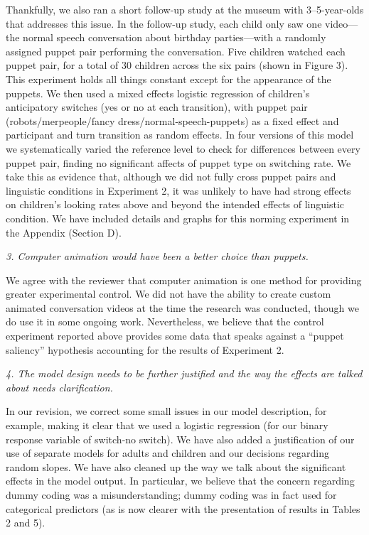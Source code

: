 \documentclass[11pt,a4paper]{letter} %
\begin{document}
\begin{letter}{}
Thankfully, we also ran a short follow-up study at the museum with 3--5-year-olds that addresses this issue. In the follow-up study, each child only saw one video---the normal speech conversation about birthday parties---with a randomly assigned puppet pair performing the conversation. Five children watched each puppet pair, for a total of 30 children across the six pairs (shown in Figure 3). This experiment holds all things constant except for the appearance of the puppets. We then used a mixed effects logistic regression of children's anticipatory switches (yes or no at each transition), with puppet pair (robots/merpeople/fancy dress/normal-speech-puppets) as a fixed effect and participant and turn transition as random effects. In four versions of this model we systematically varied the reference level to check for differences between every puppet pair, finding no significant affects of puppet type on switching rate. We take this as evidence that, although we did not fully cross puppet pairs and linguistic conditions in Experiment 2, it was unlikely to have had strong effects on children's looking rates above and beyond the intended effects of linguistic condition. We have included details and graphs for this norming experiment in the Appendix (Section D). 

\smallskip

\noindent \textit{3. Computer animation would have been a better choice than puppets.}

\noindent We agree with the reviewer that computer animation is one method for providing greater experimental control. We did not have the ability to create custom animated conversation videos at the time the research was conducted, though we do use it in some ongoing work. Nevertheless, we believe that the control experiment reported above provides some data that speaks against a ``puppet saliency'' hypothesis accounting for the results of Experiment 2. 

\smallskip

\noindent \textit{4. The model design needs to be further justified and the way the effects are talked about needs clarification.}

\noindent In our revision, we correct some small issues in our model description, for example, making it clear that we used a logistic regression (for our binary response variable of switch-no switch). We have also added a justification of our use of separate models for adults and children and our decisions regarding random slopes. We have also cleaned up the way we talk about the significant effects in the model output. In particular, we believe that the concern regarding dummy coding was a misunderstanding; dummy coding was in fact used for categorical predictors (as is now clearer with the presentation of results in Tables 2 and 5).


\end{letter}
\end{document}
